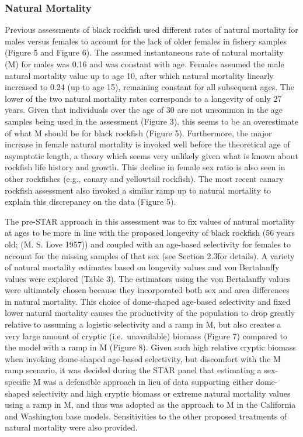 \documentclass[11pt,
  english,
  letterpaper,
]{article}
\begin{document}
\hypertarget{natural-mortality}{%
\subsubsection{Natural Mortality}\label{natural-mortality}}

Previous assessments of black rockfish used different rates of natural mortality for males versus females to account for the lack of older females in fishery samples (Figure 5 and Figure 6). The assumed instantaneous rate of natural mortality (M) for males was 0.16 and was constant with age. Females assumed the male natural mortality value up to age 10, after which natural mortality linearly increased to 0.24 (up to age 15), remaining constant for all subsequent ages. The lower of the two natural mortality rates corresponds to a longevity of only 27 years. Given that individuals over the age of 30 are not uncommon in the age samples being used in the assessment (Figure 3), this seems to be an overestimate of what M should be for black rockfish (Figure 5). Furthermore, the major increase in female natural mortality is invoked well before the theoretical age of asymptotic length, a theory which seems very unlikely given what is known about rockfish life history and growth. This decline in female sex ratio is also seen in other rockfishes (e.g., canary and yellowtail rockfish). The most recent canary rockfish assessment also invoked a similar ramp up to natural mortality to explain this discrepancy on the data (Figure 5).

The pre-STAR approach in this assessment was to fix values of natural mortality at ages to be more in line with the proposed longevity of black rockfish (56 years old; (M. S. Love 1957)) and coupled with an age-based selectivity for females to account for the missing samples of that sex (see Section 2.3for details). A variety of natural mortality estimates based on longevity values and von Bertalanffy values were explored (Table 3). The estimators using the von Bertalanffy values were ultimately chosen because they incorporated both sex and area differences in natural mortality. This choice of dome-shaped age-based selectivity and fixed lower natural mortality causes the productivity of the population to drop greatly relative to assuming a logistic selectivity and a ramp in M, but also creates a very large amount of cryptic (i.e.~unavailable) biomass (Figure 7) compared to the model with a ramp in M (Figure 8). Given such high relative cryptic biomass when invoking dome-shaped age-based selectivity, but discomfort with the M ramp scenario, it was decided during the STAR panel that estimating a sex-specific M was a defensible approach in lieu of data supporting either dome-shaped selectivity and high cryptic biomass or extreme natural mortality values using a ramp in M, and thus was adopted as the approach to M in the California and Washington base models. Sensitivities to the other proposed treatments of natural mortality were also provided.
\end{document}
